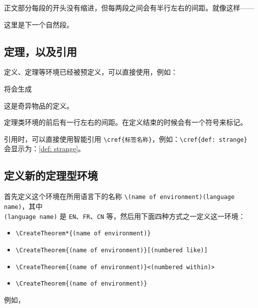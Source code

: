 \documentclass{einfart}
\begin{document}
正文部分每段的开头没有缩进，但每两段之间会有半行左右的间距。就像这样——

这里是下一个自然段。

\subsection{定理，以及引用}

定义、定理等环境已经被预定义，可以直接使用，例如：


定理类环境的前后有一行左右的间距。在定义结束的时候会有一个符号来标记。

引用时，可以直接使用智能引用 \lstinline|\cref{标签名称}|，例如：\lstinline|\cref{def: strange}| 会显示为：\cref{def: strange}。

\subsection{定义新的定理型环境}

首先定义这个环境在所用语言下的名称 \lstinline|\(name of environment)(language name)|，其中 \\\lstinline|(language name)| 是 \lstinline|EN|、\lstinline|FR|、\lstinline|CN| 等，然后用下面四种方式之一定义这一环境：
\begin{itemize}
    \item \lstinline|\CreateTheorem*{(name of environment)}|
    \item \lstinline|\CreateTheorem{(name of environment)}[(numbered like)]|
    \item \lstinline|\CreateTheorem{(name of environment)}<(numbered within)>|
    \item \lstinline|\CreateTheorem{(name of environment)}|
\end{itemize}

\def\proofideanameCN{思路}

例如，

\begin{code}
  \def\proofideanameCN{思路}
\end{code}
\end{document}
